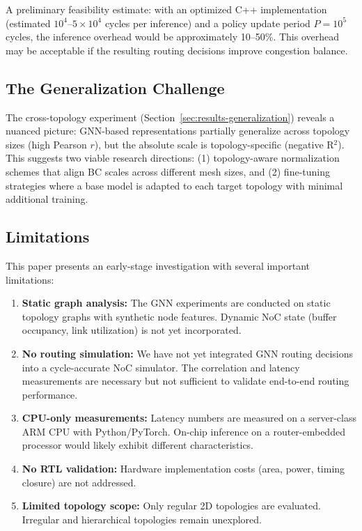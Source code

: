 \documentclass[conference]{IEEEtran}
\begin{document}
A preliminary feasibility estimate: with an optimized C++ implementation (estimated $10^4$--$5 \times 10^4$ cycles per inference) and a policy update period $P = 10^5$ cycles, the inference overhead would be approximately 10--50\%. This overhead may be acceptable if the resulting routing decisions improve congestion balance.

\subsection{The Generalization Challenge}

The cross-topology experiment (Section~\ref{sec:results-generalization}) reveals a nuanced picture: GNN-based representations partially generalize across topology sizes (high Pearson $r$), but the absolute scale is topology-specific (negative R$^2$). This suggests two viable research directions: (1) topology-aware normalization schemes that align BC scales across different mesh sizes, and (2) fine-tuning strategies where a base model is adapted to each target topology with minimal additional training.

\subsection{Limitations}
\label{sec:limitations}

This paper presents an early-stage investigation with several important limitations:
\begin{enumerate}
    \item \textbf{Static graph analysis:} The GNN experiments are conducted on static topology graphs with synthetic node features. Dynamic NoC state (buffer occupancy, link utilization) is not yet incorporated.
    \item \textbf{No routing simulation:} We have not yet integrated GNN routing decisions into a cycle-accurate NoC simulator. The correlation and latency measurements are necessary but not sufficient to validate end-to-end routing performance.
    \item \textbf{CPU-only measurements:} Latency numbers are measured on a server-class ARM CPU with Python/PyTorch. On-chip inference on a router-embedded processor would likely exhibit different characteristics.
    \item \textbf{No RTL validation:} Hardware implementation costs (area, power, timing closure) are not addressed.
    \item \textbf{Limited topology scope:} Only regular 2D topologies are evaluated. Irregular and hierarchical topologies remain unexplored.
\end{enumerate}
\end{document}
